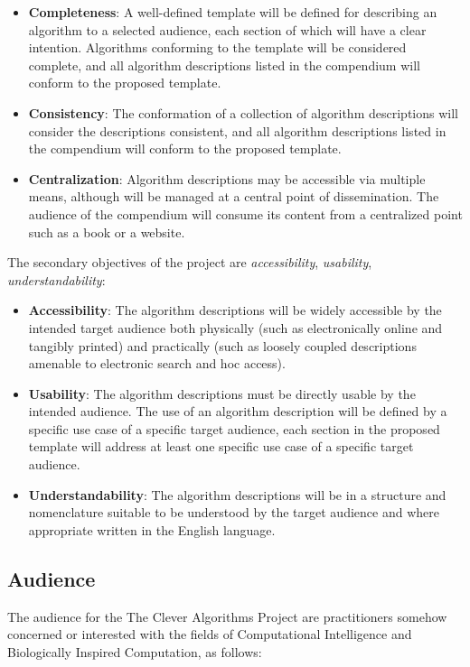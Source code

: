 \documentclass[a4paper, 11pt]{article}
\begin{document}
\begin{itemize}
	\item \textbf{Completeness}: A well-defined template will be defined for describing an algorithm to a selected audience, each section of which will have a clear intention. Algorithms conforming to the template will be considered complete, and all algorithm descriptions listed in the compendium will conform to the proposed template.
	\item \textbf{Consistency}: The conformation of a collection of algorithm descriptions will consider the descriptions consistent, and all algorithm descriptions listed in the compendium will conform to the proposed template.
	\item \textbf{Centralization}: Algorithm descriptions may be accessible via multiple means, although will be managed at a central point of dissemination. The audience of the compendium will consume its content from a centralized point such as a book or a website.
\end{itemize}

The secondary objectives of the project are \emph{accessibility}, \emph{usability}, \emph{understandability}:

\begin{itemize}
	\item \textbf{Accessibility}: The algorithm descriptions will be widely accessible by the intended target audience both physically (such as electronically online and tangibly printed) and practically (such as loosely coupled descriptions amenable to electronic search and hoc access).
	\item \textbf{Usability}: The algorithm descriptions must be directly usable by the intended audience. The use of an algorithm description will be defined by a specific use case of a specific target audience, each section in the proposed template will address at least one specific use case of a specific target audience.
	\item \textbf{Understandability}: The algorithm descriptions will be in a structure and nomenclature suitable to be understood by the target audience and where appropriate written in the English language.
\end{itemize}

\subsection{Audience}
The audience for the The Clever Algorithms Project are practitioners somehow concerned or interested with the fields of Computational Intelligence and Biologically Inspired Computation, as follows:
\end{document}
